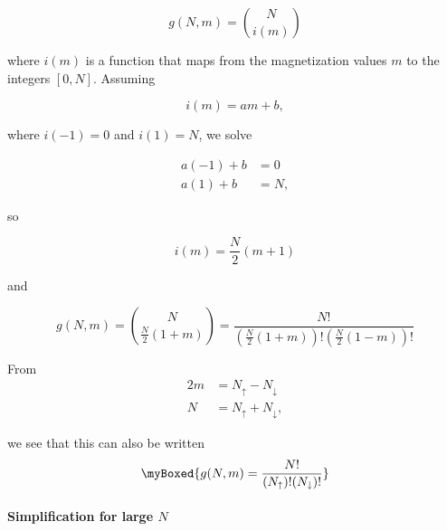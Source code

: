 {\begin{equation}\label{eqn:basicStatMechProblemSet3Problem3:20}
g(N, m) = \binom{N}{i(m)}
\end{equation}

where $i(m)$ is a function that maps from the magnetization values $m$ to the integers $[0, N]$.  Assuming

\begin{equation}\label{eqn:basicStatMechProblemSet3Problem3:40}
i(m) = a m + b,
\end{equation}

where $i(-1) = 0$ and $i(1) = N$, we solve

\begin{equation}\label{eqn:basicStatMechProblemSet3Problem3:60}
\begin{aligned}
a (-1) + b &= 0 \\
a (1) + b &= N,
\end{aligned}
\end{equation}

so

\begin{equation}\label{eqn:basicStatMechProblemSet3Problem3:80}
i(m) = \frac{N}{2}(m + 1)
\end{equation}

and

\begin{equation}\label{eqn:basicStatMechProblemSet3Problem3:100}
g(N, m) = \binom{N}{\frac{N}{2}(1 + m)} = \frac{N!}{
\left(\frac{N}{2}(1 + m)\right)!
\left(\frac{N}{2}(1 - m)\right)!
}
\end{equation}

From 
\begin{equation}\label{eqn:basicStatMechProblemSet3Problem3:120}
\begin{aligned}
2 m &= N_{\uparrow} - N_{\downarrow} \\
N &= N_{\uparrow} + N_{\downarrow},
\end{aligned}
\end{equation}

we see that this can also be written
\begin{equation}\label{eqn:basicStatMechProblemSet3Problem3:140}
\myBoxed{
g(N, m) = 
\frac{N!}{
(N_{\uparrow})!
(N_{\downarrow})!
}
}
\end{equation}

\paragraph{Simplification for large $N$}

}
